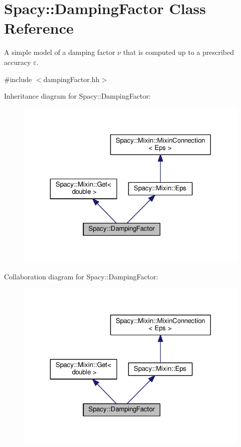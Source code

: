 \hypertarget{classSpacy_1_1DampingFactor}{}\section{Spacy\+:\+:Damping\+Factor Class Reference}
\label{classSpacy_1_1DampingFactor}


A simple model of a damping factor $\nu$ that is computed up to a prescribed accuracy $\varepsilon$.  




{\ttfamily \#include $<$damping\+Factor.\+hh$>$}



Inheritance diagram for Spacy\+:\+:Damping\+Factor\+:
\nopagebreak
\begin{figure}[H]
\begin{center}
\leavevmode
\includegraphics[width=324pt]{classSpacy_1_1DampingFactor__inherit__graph}
\end{center}
\end{figure}


Collaboration diagram for Spacy\+:\+:Damping\+Factor\+:
\nopagebreak
\begin{figure}[H]
\begin{center}
\leavevmode
\includegraphics[width=324pt]{classSpacy_1_1DampingFactor__coll__graph}
\end{center}
\end{figure}
